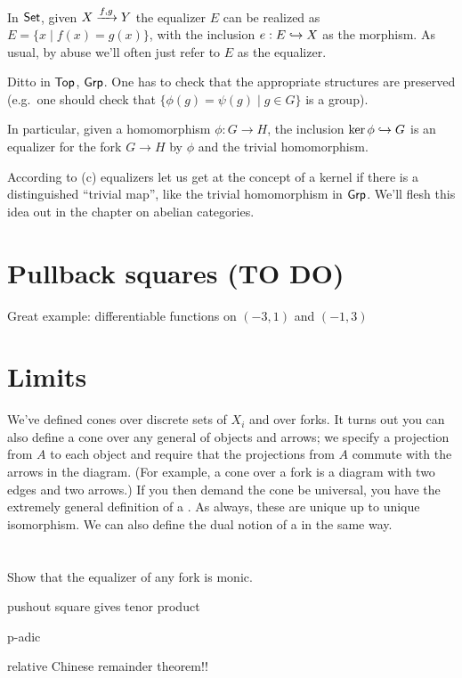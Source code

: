\begin{example}
	\listhack
	\begin{enumerate}[(a)]
		\ii In $\mathsf{Set}$, given $X \xrightarrow{f,g} Y$
		the equalizer $E$ can be realized as $E = \{x \mid f(x) = g(x)\}$,
		with the inclusion $e : E \hookrightarrow X$ as the morphism.
		As usual, by abuse we'll often just refer to $E$ as the equalizer.

		\ii Ditto in $\mathsf{Top}$, $\mathsf{Grp}$.
		One has to check that the appropriate structures are preserved
		(e.g.\ one should check that $\{\phi(g) = \psi(g) \mid g \in G\}$ is a group).

		\ii In particular, given a homomorphism $\phi : G \to H$, the inclusion
		$ \ker\phi \hookrightarrow G $
		is an equalizer for the fork $G \to H$ by $\phi$ and the trivial homomorphism.
	\end{enumerate}
\end{example}

According to (c) equalizers let us get at the concept of a kernel
if there is a distinguished
``trivial map'', like the trivial homomorphism in $\mathsf{Grp}$.
We'll flesh this idea out in the chapter on abelian categories.

\section{Pullback squares (TO DO)}
Great example: differentiable functions on $(-3,1)$ and $(-1,3)$

\begin{example}
	\label{ex:diff_pullback}
\end{example}

\section{Limits}
We've defined cones over discrete sets of $X_i$ and over forks.
It turns out you can also define a cone over any general  of objects and arrows;
we specify a projection from $A$ to each object and
require that the projections from $A$ commute with the arrows in the diagram.
(For example, a cone over a fork is a diagram with two edges and two arrows.)
If you then demand the cone be universal,
you have the extremely general definition of a .
As always, these are unique up to unique isomorphism.
We can also define the dual notion of a  in the same way.


\section{\problemhead}
\begin{sproblem}
	Show that the equalizer of any fork is monic.
	\label{prob:equalizer_monic}
\end{sproblem}

pushout square gives tenor product

p-adic


relative Chinese remainder theorem!!
